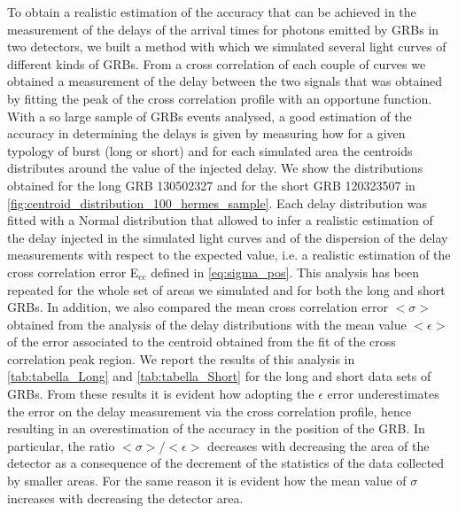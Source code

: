 \documentclass[]{spie}  %
\begin{document}
To obtain a realistic estimation of the accuracy that can be achieved in the measurement of the delays of the arrival times for photons emitted by GRBs in two detectors, we built a method with which we simulated several light curves of different kinds of GRBs. From a cross correlation of each couple of curves we obtained a measurement of the delay between the two signals that was obtained by fitting the peak of the cross correlation profile with an opportune function. \\
With a so large sample of GRBs events analysed, a good estimation of the accuracy in determining the delays is given by measuring how for a given typology of burst (long or short) and for each simulated area the centroids distributes around the value of the injected delay. We show the distributions obtained for the long GRB 130502327 and for the short GRB 120323507 in \autoref{fig:centroid_distribution_100_hermes_sample}. 
Each delay distribution was fitted with a Normal distribution that allowed to infer a realistic estimation of the delay injected in the simulated light curves and of the dispersion of the delay measurements with respect to the expected value, i.e. a realistic estimation of the cross correlation error E$_{cc}$ defined in \autoref{eq:sigma_pos}.
This analysis has been repeated for the whole set of areas we simulated and for both the long and short GRBs. In addition, we also compared the mean cross correlation error $<\sigma>$ obtained from the analysis of the delay distributions with the mean value $<\epsilon>$ of the error associated to the centroid obtained from the fit of the cross correlation peak region. We report the results of this analysis in \autoref{tab:tabella_Long} and \autoref{tab:tabella_Short} for the long and short data sets of GRBs.
From these results it is evident how adopting the $\epsilon$ error underestimates the error on the delay measurement via the cross correlation profile, hence resulting in an overestimation of the accuracy in the position of the GRB. In particular, the ratio $<\sigma>/<\epsilon>$ decreases with decreasing the area of the detector as a consequence of the decrement of the statistics of the data collected by smaller areas. For the same reason it is evident how the mean value of $\sigma$ increases with decreasing the detector area.\\
\end{document}
